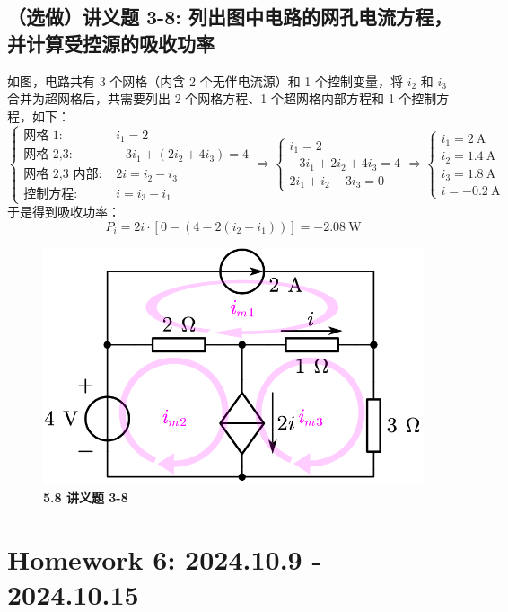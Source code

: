 \documentclass[UTF8]{report}
\theoremstyle{MyLineTheoremStyle} %
\theoremstyle{MyBlockTheoremStyle} %
\theoremstyle{MySubsubsectionStyle} %
\begin{document}
\section{（选做）讲义题 3-8: 列出图中电路的网孔电流方程，并计算受控源的吸收功率}

如图，电路共有 3 个网格（内含 2 个无伴电流源）和 1 个控制变量，将 $i_2$ 和 $i_3$ 合并为超网格后，共需要列出 2 个网格方程、1 个超网格内部方程和 1 个控制方程，如下：
\begin{equation}
\begin{cases}
    \text{网格 1: } & i_1 = 2\\ 
    \text{网格 2,3: } & -3i_1 + (2i_2 + 4i_3) = 4\\ 
    \text{网格 2,3 内部: } & 2i = i_2 - i_3\\ 
    \text{控制方程: } & i = i_3 - i_1
\end{cases}\Longrightarrow 
\begin{cases}
    i_1 = 2 \\ 
    -3i_1 + 2i_2 + 4i_3 = 4 \\
    2i_1 + i_2 - 3i_3 = 0
\end{cases}
\Longrightarrow 
\begin{cases}
    i_1 = 2 \ \mathrm{A}\\ 
    i_2 = 1.4 \ \mathrm{A}\\ 
    i_3 = 1.8 \ \mathrm{A} \\ 
    i = -0.2 \ \mathrm{A}
\end{cases}
\end{equation}
于是得到吸收功率：
\begin{equation}
    P_{i} = 2i \cdot \left[ 0 - \left(4 - 2(i_2 - i_1)\right) \right] = -2.08 \ \mathrm{W}
\end{equation}

\begin{figure}[H]\centering
\includegraphics[width=0.5\columnwidth]{assets/5/5.8.png}
\caption{\bfseries 5.8 讲义题 3-8}\label{5.8 讲义题 3-8}
\end{figure}


\chapter{Homework 6: 2024.10.9 - 2024.10.15}\thispagestyle{fancy}
\end{document}
